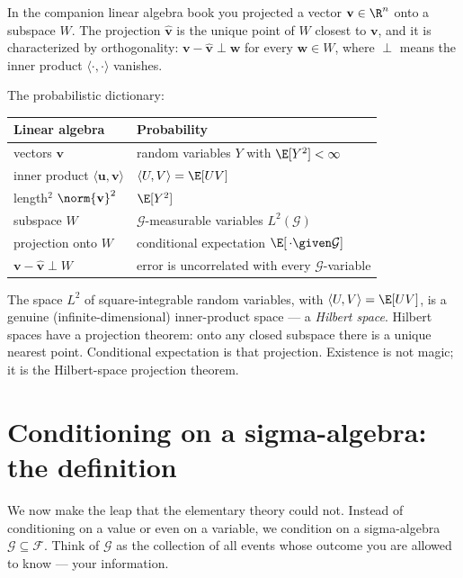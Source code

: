 \begin{connectionbox}
In the companion linear algebra book you projected a vector $\mathbf{v} \in \R^n$ onto a subspace
$W$. The projection $\hat{\mathbf{v}}$ is the unique point of $W$ closest to $\mathbf{v}$, and it is
characterized by orthogonality: $\mathbf{v} - \hat{\mathbf{v}} \perp \mathbf{w}$ for every
$\mathbf{w} \in W$, where $\perp$ means the inner product $\langle \cdot, \cdot \rangle$ vanishes.

The probabilistic dictionary:
\begin{center}
\begin{tabular}{ll}
\toprule
Linear algebra & Probability \\
\midrule
vectors $\mathbf{v}$ & random variables $Y$ with $\E[Y^2] < \infty$ \\
inner product $\langle \mathbf{u},\mathbf{v}\rangle$ & $\langle U, V \rangle = \E[UV]$ \\
length$^2$ $\norm{\mathbf{v}}^2$ & $\E[Y^2]$ \\
subspace $W$ & $\mathcal{G}$-measurable variables $L^2(\mathcal{G})$ \\
projection onto $W$ & conditional expectation $\E[\,\cdot \given \mathcal{G}]$ \\
$\mathbf{v}-\hat{\mathbf{v}} \perp W$ & error is uncorrelated with every $\mathcal{G}$-variable \\
\bottomrule
\end{tabular}
\end{center}
The space $L^2$ of square-integrable random variables, with $\langle U, V\rangle = \E[UV]$, is a
genuine (infinite-dimensional) inner-product space --- a \emph{Hilbert space}. Hilbert spaces have a
projection theorem: onto any closed subspace there is a unique nearest point. Conditional expectation
is that projection. Existence is not magic; it is the Hilbert-space projection theorem.
\end{connectionbox}

\section{Conditioning on a sigma-algebra: the definition}
\label{ch38:definition}

We now make the leap that the elementary theory could not. Instead of conditioning on a value or even
on a variable, we condition on a sigma-algebra $\mathcal{G} \subseteq \mathcal{F}$. Think of
$\mathcal{G}$ as the collection of all events whose outcome you are allowed to know --- your
information.

